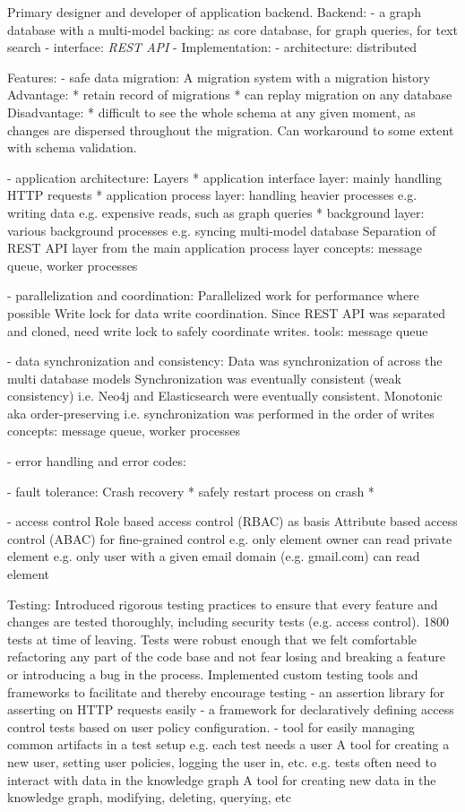 {\begin{itemize}
{Primary designer and developer of application backend.
Backend: 
- a graph database with a multi-model backing:  \rfmongodb as core database, \rfneofj for graph queries, \rfelastic for text search
- interface: {\it REST API}
- Implementation: \rfnodejs 
- architecture: distributed


Features:
- safe data migration: 
A migration system with a migration history 
Advantage: 
  * retain record of migrations
  * can replay migration on any database
Disadvantage:
  * difficult to see the whole schema at any given moment, as changes are dispersed throughout the migration.
    Can workaround to some extent with schema validation.

- application architecture: 
Layers
* application interface layer: mainly handling HTTP requests
* application process layer: handling heavier processes
  e.g. writing data
  e.g. expensive reads, such as graph queries
* background layer: various background processes
  e.g. syncing multi-model database
  Separation of REST API layer from the main application process layer
concepts: message queue, worker processes


- parallelization and coordination: 
  Parallelized work for performance where possible 
  Write lock for data write coordination. Since REST API was separated and cloned, need write lock to safely coordinate writes. 
  tools: message queue


- data synchronization and consistency: 
  Data was synchronization of across the multi database models
  Synchronization was eventually consistent (weak consistency) i.e. Neo4j and Elasticsearch were eventually consistent.
  Monotonic aka order-preserving i.e. synchronization was performed in the order of writes
  concepts: message queue, worker processes


- error handling and error codes:

  
- fault tolerance: 
  Crash recovery 
  * safely restart process on crash
  * 

- access control
  Role based access control (RBAC) as basis
  Attribute based access control (ABAC) for fine-grained control 
   e.g. only element owner can read private element 
   e.g. only user with a given email domain (e.g. gmail.com) can read element


Testing:
Introduced rigorous testing practices to ensure that every feature and changes are tested thoroughly, including security tests (e.g. access control). 
1800 tests at time of leaving. 
Tests were robust enough that we felt comfortable refactoring any part of the code base and not fear losing and breaking a feature or introducing a bug in the process.
Implemented custom testing tools and frameworks to facilitate and thereby encourage testing
- an assertion library for asserting on HTTP requests easily
- a framework for declaratively defining access control tests based on user policy configuration.
- tool for easily managing common artifacts in a test setup
  e.g. each test needs a user
  A tool for creating a new user, setting user policies, logging the user in, etc.
  e.g. tests often need to interact with data in the knowledge graph
  A tool for creating new data in the knowledge graph, modifying, deleting, querying, etc


}
\end{itemize}}
